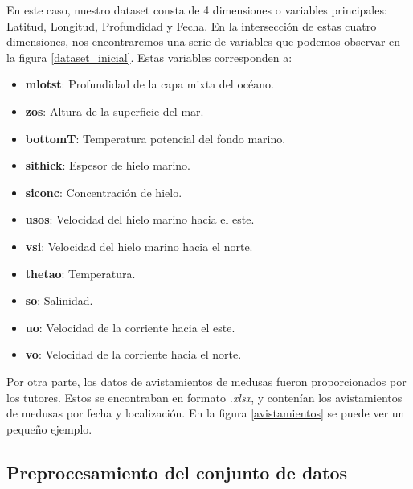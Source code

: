En este caso, nuestro dataset consta de 4 dimensiones o variables principales: Latitud, Longitud, Profundidad y Fecha.
En la intersección de estas cuatro dimensiones, nos encontraremos una serie de variables que podemos observar en la figura \ref{dataset_inicial}. Estas variables corresponden a:
\begin{itemize}
	\setlength\itemsep{-1.5em}
	\item \textbf{mlotst}: Profundidad de la capa mixta del océano.\\
	\item \textbf{zos}: Altura de la superficie del mar.\\
	\item \textbf{bottomT}: Temperatura potencial del fondo marino.\\
	\item \textbf{sithick}: Espesor de hielo marino.\\
	\item \textbf{siconc}: Concentración de hielo.\\
	\item \textbf{usos}: Velocidad del hielo marino hacia el este.\\
	\item \textbf{vsi}: Velocidad del hielo marino hacia el norte.\\
	\item \textbf{thetao}: Temperatura.\\
	\item \textbf{so}: Salinidad.\\
	\item \textbf{uo}: Velocidad de la corriente hacia el este.\\
	\item \textbf{vo}: Velocidad de la corriente hacia el norte.
\end{itemize}

\label{dataset_inicial}

Por otra parte, los datos de avistamientos de medusas fueron proporcionados por los tutores. Estos se encontraban en formato \emph{.xlsx}, y contenían los avistamientos de medusas por fecha y localización. En la figura \ref{avistamientos} se puede ver un pequeño ejemplo.

\label{avistamientos}

\subsection{Preprocesamiento del conjunto de datos}

